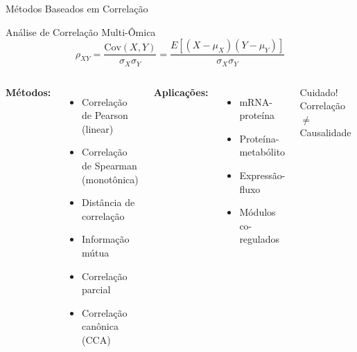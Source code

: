 \begin{frame}{Métodos Baseados em Correlação}
\begin{block}{Análise de Correlação Multi-Ômica}
\begin{equation*}
\rho_{XY} = \frac{\text{Cov}(X,Y)}{\sigma_X \sigma_Y} = \frac{E[(X-\mu_X)(Y-\mu_Y)]}{\sigma_X \sigma_Y}
\end{equation*}
\end{block}

\vspace{0.2cm}

\begin{columns}
\textbf{Métodos:}
\begin{itemize}
    \item Correlação de Pearson (linear)
    \item Correlação de Spearman (monotônica)
    \item Distância de correlação
    \item Informação mútua
    \item Correlação parcial
    \item Correlação canônica (CCA)
\end{itemize}

\textbf{Aplicações:}
\begin{itemize}
    \item mRNA-proteína
    \item Proteína-metabólito
    \item Expressão-fluxo
    \item Módulos co-regulados
\end{itemize}

\vspace{0.2cm}

\begin{alertblock}{Cuidado!}
Correlação $\neq$ Causalidade
\end{alertblock}
\end{columns}
\end{frame}

